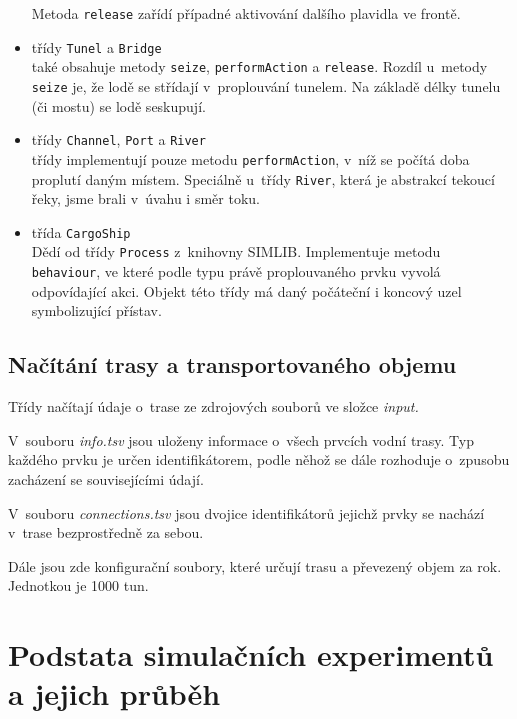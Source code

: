 \documentclass[11pt,a4paper]{article}
\begin{document}
\begin{itemize}
              Metoda \texttt{release} zařídí případné aktivování dalšího
              plavidla ve frontě.
        \item třídy \texttt{Tunel} a \texttt{Bridge} \\
              také obsahuje metody \texttt{seize}, \texttt{performAction} a
              \texttt{release}. Rozdíl u~metody \texttt{seize} je, že lodě se
              střídají v~proplouvání tunelem. Na základě délky tunelu
              (či mostu) se lodě seskupují.
        \item třídy \texttt{Channel}, \texttt{Port} a \texttt{River} \\
              třídy implementují pouze metodu \texttt{performAction}, v~níž se
              počítá doba proplutí daným místem. Speciálně u~třídy
              \texttt{River}, která je abstrakcí tekoucí řeky, jsme brali
v~úvahu i směr toku.
        \item třída \texttt{CargoShip} \\
              Dědí od třídy \texttt{Process} z~knihovny SIMLIB. Implementuje
              metodu \texttt{behaviour}, ve které podle typu právě
              proplouvaného prvku vyvolá odpovídající akci. Objekt této třídy
              má daný počáteční i
              koncový uzel symbolizující přístav.
      \end{itemize}

    \subsection{Načítání trasy a transportovaného objemu}

      Třídy načítají údaje o~trase ze zdrojových souborů ve složce
      \textit{input.}

      V~souboru \textit{info.tsv} jsou uloženy informace o~všech 
      prvcích vodní trasy. Typ každého prvku je určen identifikátorem, podle
      něhož se dále rozhoduje o~zpusobu zacházení se souvisejícími údají.

      V~souboru \textit{connections.tsv} jsou dvojice identifikátorů jejichž
      prvky se nachází v~trase bezprostředně za sebou.

      Dále jsou zde konfigurační soubory, které určují trasu a převezený objem
      za rok. Jednotkou je 1000 tun.

  \section{Podstata simulačních experimentů a jejich průběh}
\end{document}
